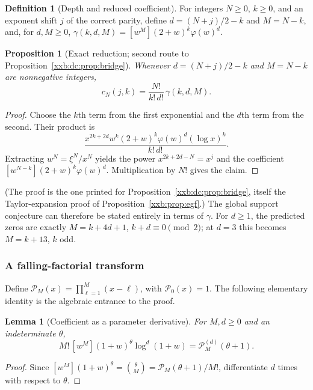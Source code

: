 \documentclass[11pt,a4paper]{article}
\numberwithin{equation}{section}
\newtheorem{proposition}[theorem]{Proposition}
\newtheorem{lemma}[theorem]{Lemma}
\theoremstyle{definition}
\newtheorem{definition}[theorem]{Definition}
\theoremstyle{remark}
\theoremstyle{plain}
\begin{document}
\begin{definition}[Depth and reduced coefficient]
For integers $N\geq0$, $k\geq0$, and an exponent shift $j$ of the correct
parity, define $d=(N+j)/2-k$ and $M=N-k$, and, for $d,M\geq0$,
$\gamma(k,d,M)=[w^M](2+w)^k\varphi(w)^d$.
\end{definition}

\begin{proposition}[Exact reduction; second route to Proposition~\ref{xxb:dc:prop:bridge}]
\label{xxb:d3:prop:exact-reduction}
Whenever $d=(N+j)/2-k$ and $M=N-k$ are nonnegative integers,
\[
  c_N(j,k)=\frac{N!}{k!\,d!}\,\gamma(k,d,M).
\]
\end{proposition}

\begin{proof}
Choose the $k$th term from the first exponential and the $d$th term from the
second.  Their product is
\[
 \frac{x^{2k+2d}w^k(2+w)^k\varphi(w)^d(\log x)^k}{k!\,d!}.
\]
Extracting $w^N=\xi^N/x^N$ yields the power $x^{2k+2d-N}=x^j$ and the
coefficient $[w^{N-k}](2+w)^k\varphi(w)^d$.  Multiplication by $N!$ gives the
claim.
\end{proof}

(The proof is the one printed for Proposition~\ref{xxb:dc:prop:bridge},
itself the Taylor-expansion proof of Proposition~\ref{xxb:prop:egf}.)  The
global support conjecture can therefore be stated entirely in terms of
$\gamma$.  For $d\geq1$, the predicted zeros are exactly
$M=k+4d+1$, $k+d\equiv0\pmod2$; at $d=3$ this becomes $M=k+13$, $k$ odd.

\subsubsection{A falling-factorial transform}\label{xxb:d3:sec:falling}

Define $\mathcal P_M(x)=\prod_{\ell=1}^{M}(x-\ell)$, with $\mathcal P_0(x)=1$.
The following elementary identity is the algebraic entrance to the proof.

\begin{lemma}[Coefficient as a parameter derivative]
\label{xxb:d3:lem:parameter-derivative}
For $M,d\geq0$ and an indeterminate $\theta$,
\[
 M!\,[w^M](1+w)^{\theta}\log^d(1+w)=\mathcal P_M^{(d)}(\theta+1).
\]
\end{lemma}

\begin{proof}
Since $[w^M](1+w)^{\theta}=\binom{\theta}{M}=\mathcal P_M(\theta+1)/M!$,
differentiate $d$ times with respect to $\theta$.
\end{proof}
\end{document}
